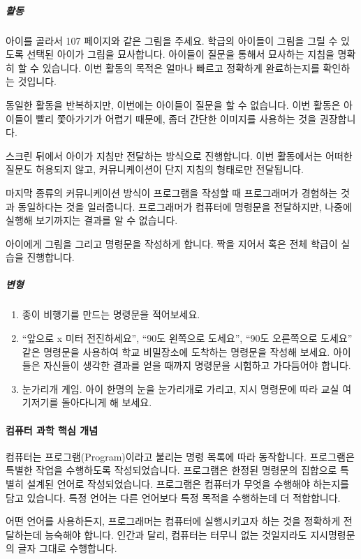 \documentclass[]{article}
\begin{document}
\subparagraph{활동}\label{section-179}

아이를 골라서 107 페이지와 같은 그림을 주세요. 학급의 아이들이 그림을
그릴 수 있도록 선택된 아이가 그림을 묘사합니다. 아이들이 질문을 통해서
묘사하는 지침을 명확히 할 수 있습니다. 이번 활동의 목적은 얼마나 빠르고
정확하게 완료하는지를 확인하는 것입니다.

동일한 활동을 반복하지만, 이번에는 아이들이 질문을 할 수 없습니다. 이번
활동은 아이들이 빨리 쫓아가기가 어렵기 때문에, 좀더 간단한 이미지를
사용하는 것을 권장합니다.

스크린 뒤에서 아이가 지침만 전달하는 방식으로 진행합니다. 이번
활동에서는 어떠한 질문도 허용되지 않고, 커뮤니케이션이 단지 지침의
형태로만 전달됩니다.

마지막 종류의 커뮤니케이션 방식이 프로그램을 작성할 때 프로그래머가
경험하는 것과 동일하다는 것을 일러줍니다. 프로그래머가 컴퓨터에 명령문을
전달하지만, 나중에 실행해 보기까지는 결과를 알 수 없습니다.

아이에게 그림을 그리고 명령문을 작성하게 합니다. 짝을 지어서 혹은 전체
학급이 실습을 진행합니다.

\subparagraph{변형}\label{section-180}

\begin{enumerate}
\item
  종이 비행기를 만드는 명령문을 적어보세요.
\item
  ``앞으로 x 미터 전진하세요'', ``90도 왼쪽으로 도세요'', ``90도
  오른쪽으로 도세요'' 같은 명령문을 사용하여 학교 비밀장소에 도착하는
  명령문을 작성해 보세요. 아이들은 자신들이 생각한 결과를 얻을 때까지
  명령문을 시험하고 가다듬어야 합니다.
\item
  눈가리개 게임. 아이 한명의 눈을 눈가리개로 가리고, 지시 명령문에 따라
  교실 여기저기를 돌아다니게 해 보세요.
\end{enumerate}

\mbox{}\paragraph{컴퓨터 과학 핵심 개념}\label{section-181}

컴퓨터는 프로그램(Program)이라고 불리는 명령 목록에 따라 동작합니다.
프로그램은 특별한 작업을 수행하도록 작성되었습니다. 프로그램은 한정된
명령문의 집합으로 특별히 설계된 언어로 작성되었습니다. 프로그램은
컴퓨터가 무엇을 수행해야 하는지를 담고 있습니다. 특정 언어는 다른
언어보다 특정 목적을 수행하는데 더 적합합니다.

어떤 언어를 사용하든지, 프로그래머는 컴퓨터에 실행시키고자 하는 것을
정확하게 전달하는데 능숙해야 합니다. 인간과 달리, 컴퓨터는 터무니 없는
것일지라도 지시명령문의 글자 그대로 수행합니다.
\end{document}
